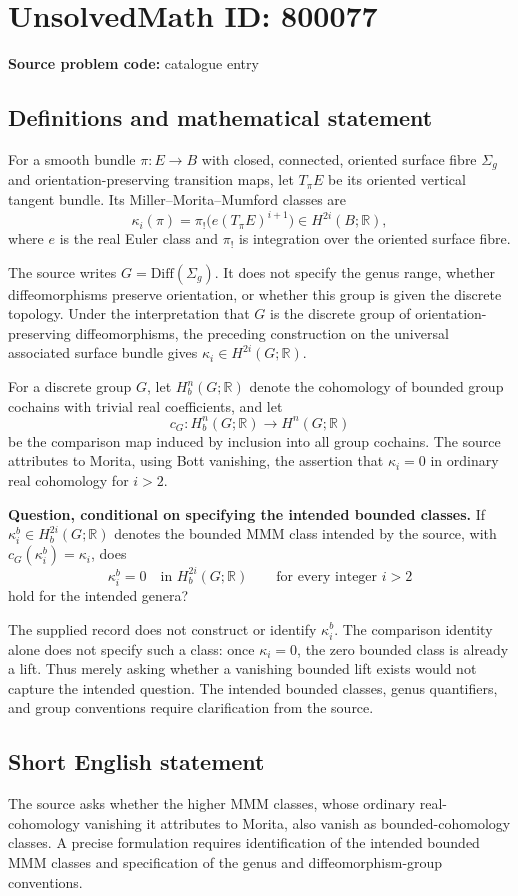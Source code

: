 \documentclass[11pt]{article}
\newcommand{\R}{\mathbb{R}}
\begin{document}
\section*{UnsolvedMath ID: 800077}
\textbf{Source problem code:} catalogue entry
\subsection{Definitions and mathematical statement}
For a smooth bundle \(\pi\colon E\to B\) with closed, connected, oriented surface fibre \(\Sigma_g\) and orientation-preserving transition maps, let \(T_\pi E\) be its oriented vertical tangent bundle. Its Miller--Morita--Mumford classes are
\[
\kappa_i(\pi)=\pi_!\bigl(e(T_\pi E)^{i+1}\bigr)\in H^{2i}(B;\R),
\]
where \(e\) is the real Euler class and \(\pi_!\) is integration over the oriented surface fibre.

The source writes \(G=\mathrm{Diff}(\Sigma_g)\). It does not specify the genus range, whether diffeomorphisms preserve orientation, or whether this group is given the discrete topology. Under the interpretation that \(G\) is the discrete group of orientation-preserving diffeomorphisms, the preceding construction on the universal associated surface bundle gives \(\kappa_i\in H^{2i}(G;\R)\).

For a discrete group \(G\), let \(H_b^n(G;\R)\) denote the cohomology of bounded group cochains with trivial real coefficients, and let
\[
c_G\colon H_b^n(G;\R)\longrightarrow H^n(G;\R)
\]
be the comparison map induced by inclusion into all group cochains. The source attributes to Morita, using Bott vanishing, the assertion that \(\kappa_i=0\) in ordinary real cohomology for \(i>2\).

\textbf{Question, conditional on specifying the intended bounded classes.} If \(\kappa_i^b\in H_b^{2i}(G;\R)\) denotes the bounded MMM class intended by the source, with \(c_G(\kappa_i^b)=\kappa_i\), does
\[
\kappa_i^b=0\quad\text{in }H_b^{2i}(G;\R)
\qquad\text{for every integer }i>2
\]
hold for the intended genera?

The supplied record does not construct or identify \(\kappa_i^b\). The comparison identity alone does not specify such a class: once \(\kappa_i=0\), the zero bounded class is already a lift. Thus merely asking whether a vanishing bounded lift exists would not capture the intended question. The intended bounded classes, genus quantifiers, and group conventions require clarification from the source.
\subsection{Short English statement}
The source asks whether the higher MMM classes, whose ordinary real-cohomology vanishing it attributes to Morita, also vanish as bounded-cohomology classes. A precise formulation requires identification of the intended bounded MMM classes and specification of the genus and diffeomorphism-group conventions.
\end{document}
